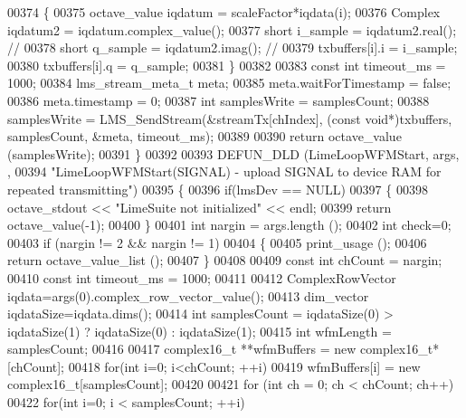 \begin{DoxyCode}
00374     \{
00375         octave\_value    iqdatum = scaleFactor*iqdata(i);
00376         Complex iqdatum2 = iqdatum.complex\_value();
00377         \textcolor{keywordtype}{short} i\_sample = iqdatum2.real(); \textcolor{comment}{//}
00378         \textcolor{keywordtype}{short} q\_sample = iqdatum2.imag(); \textcolor{comment}{//}
00379         txbuffers[i].i = i\_sample;
00380         txbuffers[i].q = q\_sample;
00381     \}
00382 
00383     \textcolor{keyword}{const} \textcolor{keywordtype}{int} timeout_ms = 1000;
00384     lms_stream_meta_t meta;
00385     meta.waitForTimestamp = \textcolor{keyword}{false};
00386     meta.timestamp = 0;
00387     \textcolor{keywordtype}{int} samplesWrite = samplesCount;
00388     samplesWrite = LMS_SendStream(&streamTx[chIndex], (\textcolor{keyword}{const} \textcolor{keywordtype}{void}*)txbuffers, samplesCount, &meta, 
      timeout\_ms);
00389 
00390     \textcolor{keywordflow}{return} octave\_value (samplesWrite);
00391 \}
00392 
00393 DEFUN_DLD (LimeLoopWFMStart, args, ,
00394 \textcolor{stringliteral}{"LimeLoopWFMStart(SIGNAL) - upload SIGNAL to device RAM for repeated transmitting"})
00395 \{
00396     \textcolor{keywordflow}{if}(lmsDev == NULL)
00397     \{
00398         octave\_stdout << \textcolor{stringliteral}{"LimeSuite not initialized"} << endl;
00399         \textcolor{keywordflow}{return} octave\_value(-1);
00400     \}
00401     \textcolor{keywordtype}{int} nargin = args.length ();
00402     \textcolor{keywordtype}{int} check=0;
00403     \textcolor{keywordflow}{if} (nargin != 2 && nargin != 1)
00404     \{
00405         print\_usage ();
00406         \textcolor{keywordflow}{return} octave\_value\_list ();
00407     \}
00408 
00409     \textcolor{keyword}{const} \textcolor{keywordtype}{int} chCount = nargin;
00410     \textcolor{keyword}{const} \textcolor{keywordtype}{int} timeout_ms = 1000;
00411 
00412     ComplexRowVector    iqdata=args(0).complex\_row\_vector\_value();
00413     dim\_vector          iqdataSize=iqdata.dims();
00414     \textcolor{keywordtype}{int} samplesCount = iqdataSize(0) > iqdataSize(1) ? iqdataSize(0) : iqdataSize(1);
00415     \textcolor{keywordtype}{int} wfmLength = samplesCount;
00416 
00417     complex16_t **wfmBuffers = \textcolor{keyword}{new} complex16_t*[chCount];
00418     \textcolor{keywordflow}{for}(\textcolor{keywordtype}{int} i=0; i<chCount; ++i)
00419         wfmBuffers[i] = \textcolor{keyword}{new} complex16_t[samplesCount];
00420 
00421     \textcolor{keywordflow}{for} (\textcolor{keywordtype}{int} ch = 0; ch < chCount; ch++)
00422         \textcolor{keywordflow}{for}(\textcolor{keywordtype}{int} i=0; i < samplesCount; ++i)

\end{DoxyCode}
